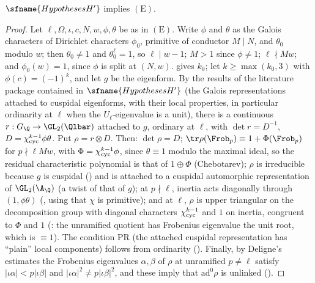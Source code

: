 \begin{proposition}\label{pf:eis:propE}
$\sfname{HypothesesH'}$ implies $(\mathrm{E})$.
\end{proposition}

\begin{proof}
Let $\ell,\Omega,\iota,c,N,w,\phi,\theta$ be as in $(\mathrm{E})$. Write $\phi$ and $\theta$ as the Galois characters of Dirichlet characters $\phi_0$, primitive of
conductor $M\mid N$, and $\theta_0$ modulo $w$; then $\theta_0\ne1$ and $\theta_0^\ell=1$, so $\ell\mid w-1$; $M>1$ since $\phi\ne1$; $\ell\nmid Mw$; and $\phi_0(w)=1$,
since $\phi$ is split at $(N,w)$.  gives $k_0$; let $k\ge\max(k_0,3)$ with $\phi(c)=(-1)^k$, and let $g$ be the eigenform. By the
results of the literature package contained in $\sfname{HypothesesH'}$ (the Galois representations attached to cuspidal eigenforms,
with their local properties, in particular ordinarity at $\ell$ when the $U_\ell$-eigenvalue is a unit), there is a continuous
$r:G_\Q\to\GL_2(\Qlbar)$ attached to $g$, ordinary at $\ell$, with $\det r=D^{-1}$, $D=\chi_{\mathrm{cyc}}^{k-1}\phi\theta$. Put $\rho=r\otimes D$. Then:
$\det\rho=D$; $\tr\rho(\Frob_p)\equiv1+\Phi(\Frob_p)$ for $p\nmid\ell Mw$, with $\Phi=\chi_{\mathrm{cyc}}^{k-1}\phi$, since $\theta\equiv1$ modulo the maximal ideal,
so the residual characteristic polynomial is that of $1\oplus\Phi$ (Chebotarev); $\rho$ is irreducible because $g$ is cuspidal
() and is attached to a cuspidal automorphic representation of
$\GL_2(\A_\Q)$ (a twist of that of $g$); at $p\nmid\ell$, inertia acts diagonally through $(1,\phi\theta)$
(, using that $\chi$ is primitive); and at $\ell$, $\rho$ is upper triangular on the
decomposition group with diagonal characters $\chi_{\mathrm{cyc}}^{k-1}$ and $1$ on inertia, congruent to $\Phi$ and $1$
(: the unramified quotient has Frobenius eigenvalue the unit root, which is
$\equiv1$). The condition $\mathrm{PR}$ (the attached cuspidal representation has ``plain'' local components) follows from ordinarity
(). Finally, by Deligne's estimates the Frobenius eigenvalues $\alpha,\beta$ of $\rho$ at unramified
$p\ne\ell$ satisfy $|\iota\alpha|<p|\iota\beta|$ and $|\iota\alpha|^2\ne p|\iota\beta|^2$, and these imply that $\mathrm{ad}^0\rho$ is unlinked
().
\end{proof}

